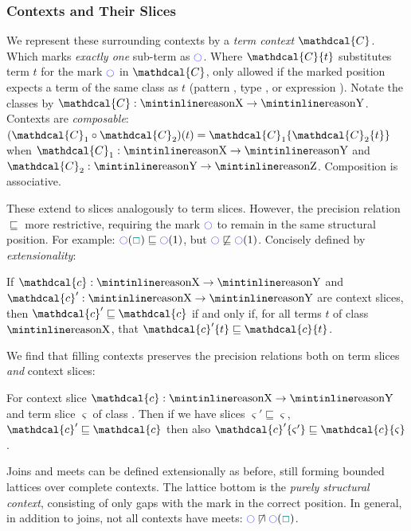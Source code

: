 \subsubsection{Contexts and Their Slices}
\renewcommand{\C}{\mathdcal{C}}
We represent these surrounding contexts by a \textit{term context} $\mathdcal{C}$. Which marks \textit{exactly one} sub-term as $\cmark$. Where $\C\{t\}$ substitutes term $t$ for the mark $\cmark$ in $\C$, only allowed if the marked position expects a term of the same class as $t$ (pattern , type , or expression ). Notate the classes by $\C : \code{X} \to \code{Y}$. Contexts are \textit{composable}: $(\C_1 \circ \C_2)(t) = \C_1\{\C_2\{t\}\}$ when $\C_1 : \code{X} \to \code{Y}$ and $\C_2 : \code{Y} \to \code{Z}$. Composition is associative.


\newcommand{\Cs}{\mathdcal{c}}
\newcommand{\p}{\mathdcal{p}}
These extend to slices analogously to term slices. However, the precision relation $\sqsubseteq$ more restrictive, requiring the mark $\cmark$ to remain in the same structural position. For example: $\cmark(\gap) \sqsubseteq \cmark(1)$, but $\cmark \not \sqsubseteq \cmark(1)$. Concisely defined by \textit{extensionality}:

\begin{definition}\label{def:ContextPrecision}
If $\Cs : \code{X} \to \code{Y}$ and $\Cs' : \code{X} \to \code{Y}$ are context slices, then $\Cs' \sqsubseteq \Cs$ if and only if, for all terms $t$ of class $\code{X}$, that $\Cs'\{t\} \sqsubseteq \Cs\{t\}$.
\end{definition}

We find that filling contexts preserves the precision relations both on term slices \textit{and} context slices:
\begin{proposition}
For context slice $\Cs : \code{X} \to \code{Y}$ and term slice $\varsigma$ of class . Then if we have slices $\varsigma' \sqsubseteq \varsigma$, $\Cs' \sqsubseteq \Cs$ then also $\Cs'\{\varsigma'\} \sqsubseteq \Cs\{\varsigma\}$.
\end{proposition}

Joins and meets can be defined extensionally as before, still forming bounded lattices over complete contexts. The lattice bottom is the \textit{purely structural context}, consisting of only gaps with the mark in the correct position. In general, in addition to joins, not all contexts have meets: $\cmark\centernot \sqcap \cmark(\gap)$.

